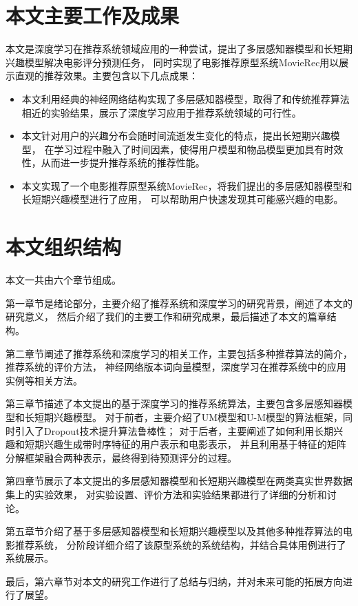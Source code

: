 \section{本文主要工作及成果}
本文是深度学习在推荐系统领域应用的一种尝试，提出了多层感知器模型和长短期兴趣模型解决电影评分预测任务，
同时实现了电影推荐原型系统MovieRec用以展示直观的推荐效果。主要包含以下几点成果：

\begin{itemize}
\item
本文利用经典的神经网络结构实现了多层感知器模型，取得了和传统推荐算法相近的实验结果，展示了深度学习应用于推荐系统领域的可行性。
\item
本文针对用户的兴趣分布会随时间流逝发生变化的特点，提出长短期兴趣模型，
在学习过程中融入了时间因素，使得用户模型和物品模型更加具有时效性，从而进一步提升推荐系统的推荐性能。
\item
本文实现了一个电影推荐原型系统MovieRec，将我们提出的多层感知器模型和长短期兴趣模型进行了应用，
可以帮助用户快速发现其可能感兴趣的电影。
\end{itemize}

\section{本文组织结构}
本文一共由六个章节组成。

第一章节是绪论部分，主要介绍了推荐系统和深度学习的研究背景，阐述了本文的研究意义，
然后介绍了我们的主要工作和研究成果，最后描述了本文的篇章结构。

第二章节阐述了推荐系统和深度学习的相关工作，主要包括多种推荐算法的简介，推荐系统的评价方法，
神经网络版本词向量模型，深度学习在推荐系统中的应用实例等相关方法。

第三章节描述了本文提出的基于深度学习的推荐系统算法，主要包含多层感知器模型和长短期兴趣模型。
对于前者，主要介绍了UM模型和U-M模型的算法框架，同时引入了Dropout技术提升算法鲁棒性；
对于后者，主要阐述了如何利用长期兴趣和短期兴趣生成带时序特征的用户表示和电影表示，
并且利用基于特征的矩阵分解框架融合两种表示，最终得到待预测评分的过程。

第四章节展示了本文提出的多层感知器模型和长短期兴趣模型在两类真实世界数据集上的实验效果，
对实验设置、评价方法和实验结果都进行了详细的分析和讨论。

第五章节介绍了基于多层感知器模型和长短期兴趣模型以及其他多种推荐算法的电影推荐系统，
分阶段详细介绍了该原型系统的系统结构，并结合具体用例进行了系统展示。

最后，第六章节对本文的研究工作进行了总结与归纳，并对未来可能的拓展方向进行了展望。


